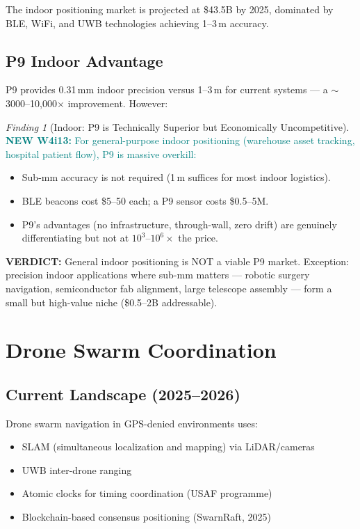 \documentclass[11pt]{article}
\theoremstyle{definition}
\theoremstyle{remark}
\newtheorem{finding}[theorem]{Finding}
\newcommand{\verdict}[1]{\textcolor{green!50!black}{\textbf{VERDICT:} #1}}
\newcommand{\newfinding}[1]{\textcolor{teal}{\textbf{NEW W4i13:} #1}}
\begin{document}
The indoor positioning market is projected at \$43.5B by 2025, dominated
by BLE, WiFi, and UWB technologies achieving 1--3\,m accuracy.

\subsection{P9 Indoor Advantage}

P9 provides 0.31\,mm indoor precision versus 1--3\,m for current systems
--- a $\sim$3000--10{,}000$\times$ improvement. However:

\begin{finding}[Indoor: P9 is Technically Superior but Economically Uncompetitive]
\label{find:indoor}
\newfinding{For general-purpose indoor positioning (warehouse asset tracking,
hospital patient flow), P9 is massive overkill:}
\begin{itemize}[nosep]
\item Sub-mm accuracy is not required (1\,m suffices for most indoor
  logistics).
\item BLE beacons cost \$5--50 each; a P9 sensor costs \$0.5--5M.
\item P9's advantages (no infrastructure, through-wall, zero drift)
  are genuinely differentiating but not at $10^3$--$10^6\times$ the
  price.
\end{itemize}

\verdict{General indoor positioning is NOT a viable P9 market.
Exception: precision indoor applications where sub-mm matters ---
robotic surgery navigation, semiconductor fab alignment, large
telescope assembly --- form a small but high-value niche
(\$0.5--2B addressable).}
\end{finding}

\section{Drone Swarm Coordination}
\label{sec:drone-swarm}

\subsection{Current Landscape (2025--2026)}

Drone swarm navigation in GPS-denied environments uses:
\begin{itemize}[nosep]
\item SLAM (simultaneous localization and mapping) via LiDAR/cameras
\item UWB inter-drone ranging
\item Atomic clocks for timing coordination (USAF programme)
\item Blockchain-based consensus positioning (SwarnRaft, 2025)
\end{itemize}
\end{document}
